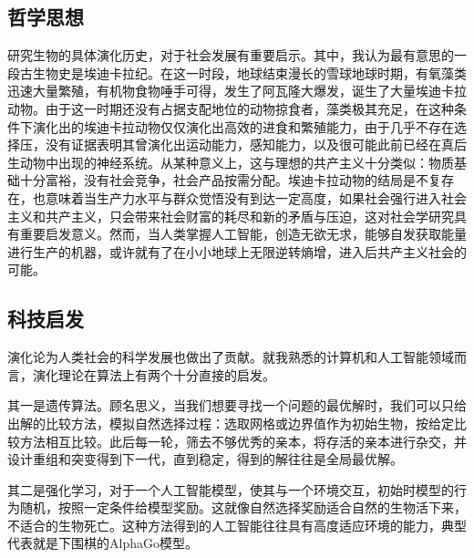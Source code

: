 \documentclass[a4paper]{IEEEtran}
\begin{document}
			\subsection{哲学思想}
			研究生物的具体演化历史，对于社会发展有重要启示。其中，我认为最有意思的一段古生物史是埃迪卡拉纪。在这一时段，地球结束漫长的雪球地球时期，有氧藻类迅速大量繁殖，有机物食物唾手可得，发生了阿瓦隆大爆发，诞生了大量埃迪卡拉动物。由于这一时期还没有占据支配地位的动物掠食者，藻类极其充足，在这种条件下演化出的埃迪卡拉动物仅仅演化出高效的进食和繁殖能力，由于几乎不存在选择压，没有证据表明其曾演化出运动能力，感知能力，以及很可能此前已经在真后生动物中出现的神经系统。从某种意义上，这与理想的共产主义十分类似：物质基础十分富裕，没有社会竞争，社会产品按需分配。埃迪卡拉动物的结局是不复存在，也意味着当生产力水平与群众觉悟没有到达一定高度，如果社会强行进入社会主义和共产主义，只会带来社会财富的耗尽和新的矛盾与压迫，这对社会学研究具有重要启发意义。然而，当人类掌握人工智能，创造无欲无求，能够自发获取能量进行生产的机器，或许就有了在小小地球上无限逆转熵增，进入后共产主义社会的可能。
			\subsection{科技启发}
			演化论为人类社会的科学发展也做出了贡献。就我熟悉的计算机和人工智能领域而言，演化理论在算法上有两个十分直接的启发。
			
			其一是遗传算法。顾名思义，当我们想要寻找一个问题的最优解时，我们可以只给出解的比较方法，模拟自然选择过程：选取网格或边界值作为初始生物，按给定比较方法相互比较。此后每一轮，筛去不够优秀的亲本，将存活的亲本进行杂交，并设计重组和突变得到下一代，直到稳定，得到的解往往是全局最优解。
			
			其二是强化学习，对于一个人工智能模型，使其与一个环境交互，初始时模型的行为随机，按照一定条件给模型奖励。这就像自然选择奖励适合自然的生物活下来，不适合的生物死亡。这种方法得到的人工智能往往具有高度适应环境的能力，典型代表就是下围棋的AlphaGo模型。
\end{document}
